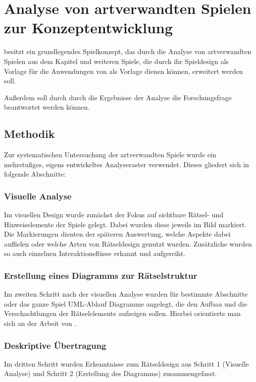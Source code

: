 \chapter{Analyse von artverwandten Spielen zur Konzeptentwicklung}\label{sec:analysis}
 besitzt ein grundlegendes Spielkonzept, das durch die Analyse von artverwandten Spielen aus dem Kapitel \emph{} und weiteren Spiele, die durch ihr Spieldesign als Vorlage für die Anwendungen von  als Vorlage dienen können, erweitert werden soll.

Außerdem soll durch durch die Ergebnisse der Analyse die Forschungsfrage \emph{} beantwortet werden können.

\section{Methodik}
Zur systematischen Untersuchung der artverwandten Spiele wurde ein mehrstufiges, eigens entwickeltes Analyseraster verwendet. Dieses gliedert sich in folgende Abschnitte:

\subsection{Visuelle Analyse}
Im visuellen Design wurde zunächst der Fokus auf sichtbare Rätsel- und Hinweiselemente der Spiele gelegt. Dabei wurden diese jeweils im Bild markiert. Die Markierungen dienten der späteren Auswertung, welche Aspekte dabei auffielen oder welche Arten von Rätseldesign genutzt wurden. Zusätzliche wurden so auch einzelnen Interaktionsflüsse erkannt und aufgereiht.

\subsection{Erstellung eines Diagramms zur Rätselstruktur}
Im zweiten Schritt nach der visuellen Analyse wurden für bestimmte Abschnitte oder das ganze Spiel UML-Ablauf Diagramme angelegt, die den Aufbau und die Verschachtlungen der Rätselelemente aufzeigen sollen. Hierbei orientierte man sich an der Arbeit von \cite{tim_schafer_grim_1996}.

\subsection{Deskriptive Übertragung}
Im dritten Schritt wurden Erkenntnisse zum Rätseldesign aus Schritt 1 (Visuelle Analyse) und Schritt 2 (Erstellung des Diagramms) zusammengefasst.

